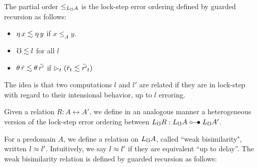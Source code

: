 

The partial order $\le_{L_\mho A}$ is the lock-step error ordering defined by guarded recursion as follows:

\begin{itemize}
    \item 	$\eta\, x \lesssim \eta\, y$ if $x \le_A y$.
    \item 	$\mho \lesssim l$ for all $l$ 
    \item   $\theta\, \tilde{r} \lesssim \theta\, \tilde{r'}$ if
            $\vartriangleright_t (\tilde{r}_t \lesssim \tilde{r'}_t)$
  \end{itemize}

The idea is that two computations $l$ and $l'$ are related if they are in
lock-step with regard to their intensional behavior, up to $l$ erroring.

Given a relation $R : A \rel A'$, we define in an analogous manner a heterogeneous
version of the lock-step error ordering between $L_\mho R : L_\mho A \mathrel{\circ\mkern-6mu-\mkern-6mu\bullet} L_\mho A'$.



For a predomain $A$, we define a relation on $L_\mho A$, called ``weak bisimilarity",
written $l \approx l'$. Intuitively, we say $l \approx l'$ if they are equivalent ``up to delay''.
The weak bisimilarity relation is defined by guarded recursion as follows:

